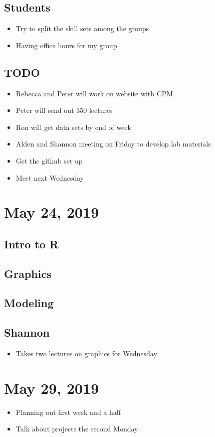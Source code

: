 \documentclass{article}
\begin{document}
\subsection{Students}
\label{sec:orgecd2210}
\begin{itemize}
\item Try to split the skill sets among the groups
\item Having office hours for my group
\end{itemize}
\subsection{{\bfseries\sffamily TODO} }
\label{sec:org3fa42b8}
\begin{itemize}
\item Rebecca and Peter will work on website with CPM
\item Peter will send out 350 lectures
\item Ron will get data sets by end of week
\item Alden and Shannon meeting on Friday to develop lab materials
\item Get the github set up
\item Meet next Wednesday
\end{itemize}
\section{May 24, 2019}
\label{sec:org7e08f00}
\subsection{Intro to R}
\label{sec:org67289e7}
\subsection{Graphics}
\label{sec:org6939f72}
\subsection{Modeling}
\label{sec:orgf1cd13f}
\subsection{Shannon}
\label{sec:org743587d}
\begin{itemize}
\item Takes two lectures on graphics for Wednesday
\end{itemize}
\section{May 29, 2019}
\label{sec:org783193e}
\begin{itemize}
\item Planning out first week and a half
\item Talk about projects the second Monday
\end{itemize}
\end{document}
